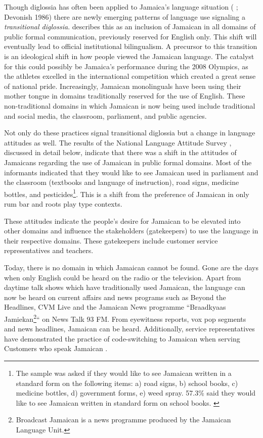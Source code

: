 \documentclass[output=paper,colorlinks,citecolor=brown]{langscibook}
\begin{document}
Though diglossia has often been applied to Jamaica’s language situation (\citeauthor{Winford1985} \citeyear{Winford1985}; Devonish 1986) there are newly emerging patterns of language use signaling a \emph{transitional diglossia}. \citet{Walters2016} describes this as an inclusion of Jamaican in all domains of public formal communication, previously reserved for English only. This shift will eventually lead to official institutional bilingualism. A precursor to this transition is an ideological shift in how people viewed the Jamaican language. The catalyst for this could possibly be Jamaica’s performance during the 2008 Olympics, as the athletes excelled in the international competition which created a great sense of national pride. Increasingly, Jamaican monolinguals have been using their mother tongue in domains traditionally reserved for the use of English. These non-traditional domains in which Jamaican is now being used include traditional and social media, the classroom, parliament, and public agencies.

Not only do these practices signal transitional diglossia but a change in language attitudes as well. The results of the National Language Attitude Survey \citep{JamaicanLanguageUnit2005}, discussed in detail below, indicate that there was a shift in the attitudes of Jamaicans regarding the use of Jamaican in public formal domains. Most of the informants indicated that they would like to see Jamaican used in parliament and the classroom (textbooks and language of instruction), road signs, medicine bottles, and pesticides\footnote{The sample was asked if they would like to see Jamaican written in a standard form on the following items: a) road signs, b) school books, c) medicine bottles, d) government forms, e) weed spray.  57.3\% said they would like to see Jamaican written in standard form on school books. \citep{JamaicanLanguageUnit2005}}. This is a shift from the preference of Jamaican in only rum bar and roots play type contexts. 

These attitudes indicate the people’s desire for Jamaican to be elevated into other domains and influence the stakeholders (gatekeepers) to use the language in their respective domains. These gatekeepers include customer service representatives and teachers. 

Today, there is no domain in which Jamaican cannot be found. Gone are the days when only English could be heard on the radio or the television. Apart from daytime talk shows which have traditionally used Jamaican, the language can now be heard on current affairs and news programs such as Beyond the Headlines, CVM Live and the Jamaican News programme “Braadkyaas Jamiekan\footnote{Broadcast Jamaican is a news programme produced by the Jamaican Language Unit.}“ on News Talk 93 FM. From eyewitness reports, vox pop segments and news headlines, Jamaican can be heard. Additionally, service representatives have demonstrated the practice of code-switching to Jamaican when serving Customers who speak Jamaican \citep{Walters2015}. 
 
\end{document}

